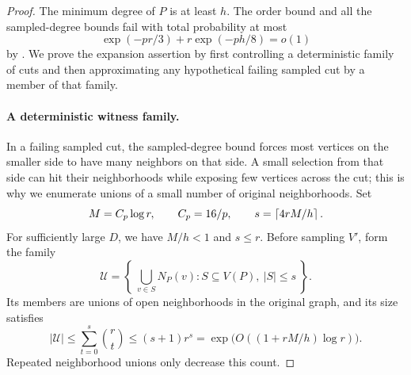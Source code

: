 \begin{proof}
The minimum degree of $P$ is at least $h$.  The order bound and all
the sampled-degree bounds fail with total probability at most
\begin{equation}\label{eq:residue-size-degree-error}
  \exp(-pr/3)+r\exp(-ph/8)=o(1)
\end{equation}
by .  We prove the expansion assertion by first
controlling a deterministic family of cuts and then approximating
any hypothetical failing sampled cut by a member of that family.

\paragraph{A deterministic witness family.}
In a failing sampled cut, the sampled-degree bound forces most vertices
on the smaller side to have many neighbors on that side. A small
selection from that side can hit their neighborhoods while exposing few
vertices across the cut; this is why we enumerate unions of a small
number of original neighborhoods.
Set
\[
  M=C_p\log r,\qquad C_p=16/p,\qquad
  s=\left\lceil4rM/h\right\rceil.
\]
For sufficiently large $D$, we have $M/h<1$ and $s\le r$.
Before sampling $V'$, form the family
\[
  \mathcal U=
  \left\{\ \bigcup_{v\in S}N_P(v):
                   S\subseteq V(P),\ |S|\le s\ \right\}.
\]
Its members are unions of open neighborhoods in the original graph,
and its size satisfies
\begin{equation}\label{eq:residue-witness-count}
  |\mathcal U|
  \le\sum_{t=0}^s\binom rt
  \le(s+1)r^s
  =\exp\!\bigl(O((1+rM/h)\log r)\bigr).
\end{equation}
Repeated neighborhood unions only decrease this count.


\end{proof}
